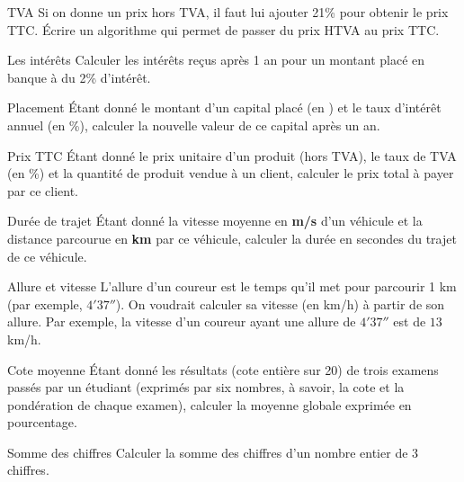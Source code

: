 		\begin{Exercice}{TVA}
			Si on donne un prix hors TVA, il faut lui ajouter 21\% 
			pour obtenir le prix TTC. Écrire un algorithme qui permet 
			de passer du prix HTVA au prix TTC.
		\end{Exercice}
	
		\begin{Exercice}{Les intérêts}
			Calculer les intérêts reçus après 1 an pour un montant placé en 
			banque à du 2\% d’intérêt.
		\end{Exercice}
	
		\begin{Exercice}{Placement}
			Étant donné le montant d’un capital placé (en \texteuro) 
			et le taux d’intérêt annuel (en \%), 
			calculer la nouvelle valeur de ce capital après un an.
		\end{Exercice}
	
		\begin{Exercice}{Prix TTC}
			Étant donné le prix unitaire d’un produit
			(hors TVA), le taux de TVA (en \%) et la quantité de produit vendue à
			un client, calculer le prix total à payer par ce client.
		\end{Exercice}
	
		\begin{Exercice}{Durée de trajet}
			Étant donné la vitesse moyenne en \textbf{m/s}
			d’un véhicule et la distance parcourue en \textbf{km} par ce véhicule,
			calculer la durée en secondes du trajet de ce véhicule.
		\end{Exercice}
	
		\begin{Exercice}{Allure et vitesse}
			L'allure d'un coureur est le temps qu'il met pour parcourir 1 km
			(par exemple, $4'37''$).
			On voudrait calculer sa vitesse (en km/h) à partir de son allure.
			Par exemple, la vitesse d'un coureur ayant une allure de
			$4'37''$ est de $13$ km/h. 
		\end{Exercice}
	
		\begin{Exercice}{Cote moyenne}
			Étant donné les résultats (cote entière sur
			20) de trois examens passés par un étudiant (exprimés par six nombres,
			à savoir, la cote et la pondération de chaque examen), calculer 
			la moyenne globale exprimée en pourcentage.
		\end{Exercice}
	
		\begin{Exercice}{Somme des chiffres}
			Calculer la somme des chiffres
			d’un nombre entier de 3 chiffres.
		\end{Exercice}
	

